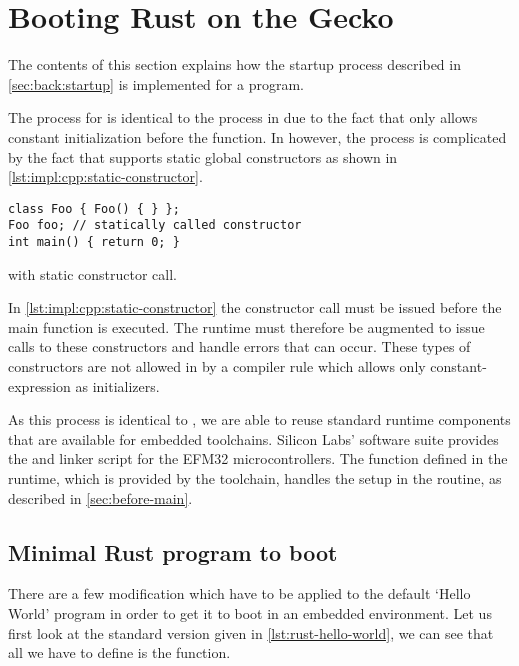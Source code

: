 \section{Booting Rust on the Gecko}
\label{sec:impl:booting}

The contents of this section explains how the startup process described in \autoref{sec:back:startup} is implemented for a {\rust} program.

The process for {\rust} is identical to the process in {\C} due to the fact that {\rust} only allows constant initialization before the {\main} function.
In {\Cpp} however, the process is complicated by the fact that {\Cpp} supports static global constructors as shown in \autoref{lst:impl:cpp:static-constructor}.

\begin{listing}[H]
  \begin{verbatim}
class Foo { Foo() { } };
Foo foo; // statically called constructor
int main() { return 0; }
  \end{verbatim}
  \caption{{\Cpp} with static constructor call.}
  \label{lst:impl:cpp:static-constructor}
\end{listing}

In \autoref{lst:impl:cpp:static-constructor} the  constructor call must be issued before the main function is executed.
The runtime must therefore be augmented to issue calls to these constructors and handle errors that can occur.
These types of constructors are not allowed in {\rust} by a compiler rule which allows only constant-expression as initializers.

As this process is identical to {\C}, we are able to reuse standard runtime components that are available for {\C} embedded toolchains.
Silicon Labs' software suite provides the  and linker script for the EFM32 microcontrollers.
The  function defined in the {\C} runtime, which is provided by the {\armgcc} toolchain, handles the setup in the  routine, as described in \autoref{sec:before-main}.

\subsection{Minimal Rust program to boot}
\label{ssec:minimal_rust_program_to_boot}

There are a few modification which have to be applied to the default `Hello World' program in order to get it to boot in an embedded environment.
Let us first look at the standard version given in \autoref{lst:rust-hello-world}, we can see that all we have to define is the  function.

